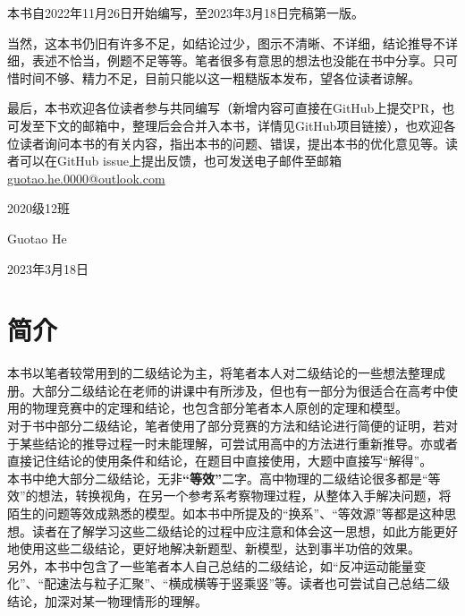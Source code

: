 \documentclass{gbook}
\begin{document}
本书自2022年11月26日开始编写，至2023年3月18日完稿第一版。

当然，这本书仍旧有许多不足，如结论过少，图示不清晰、不详细，结论推导不详细，表述不恰当，例题不足等等。笔者很多有意思的想法也没能在书中分享。只可惜时间不够、精力不足，目前只能以这一粗糙版本发布，望各位读者谅解。

最后，本书欢迎各位读者参与共同编写（新增内容可直接在GitHub上提交PR，也可发至下文的邮箱中，整理后会合并入本书，详情见GitHub项目链接），也欢迎各位读者询问本书的有关内容，指出本书的问题、错误，提出本书的优化意见等。读者可以在GitHub issue上提出反馈，也可发送电子邮件至邮箱\url{guotao.he.0000@outlook.com}
~\\

\begin{flushright}
2020级12班

Guotao He

2023年3月18日
\end{flushright}
\newpage

\section*{简介}


本书以笔者较常用到的二级结论为主，将笔者本人对二级结论的一些想法整理成册。大部分二级结论在老师的讲课中有所涉及，但也有一部分为很适合在高考中使用的物理竞赛中的定理和结论，也包含部分笔者本人原创的定理和模型。
~\\

对于书中部分二级结论，笔者使用了部分竞赛的方法和结论进行简便的证明，若对于某些结论的推导过程一时未能理解，可尝试用高中的方法进行重新推导。亦或者直接记住结论的使用条件和结论，在题目中直接使用，大题中直接写“解得”。
~\\

本书中绝大部分二级结论，无非\textbf{“等效”}二字。高中物理的二级结论很多都是“等效”的想法，转换视角，在另一个参考系考察物理过程，从整体入手解决问题，将陌生的问题等效成熟悉的模型。如本书中所提及的“换系”、“等效源”等都是这种思想。读者在了解学习这些二级结论的过程中应注意和体会这一思想，如此方能更好地使用这些二级结论，更好地解决新题型、新模型，达到事半功倍的效果。
~\\

另外，本书中包含了一些笔者本人自己总结的二级结论，如“反冲运动能量变化”、“配速法与粒子汇聚”、“横成横等于竖乘竖”等。读者也可尝试自己总结二级结论，加深对某一物理情形的理解。
~\\
\end{document}
